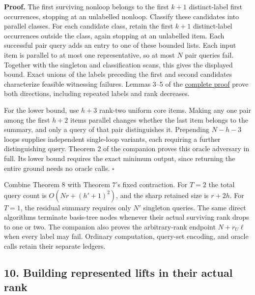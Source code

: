 \textbf{Proof.} The first surviving nonloop belongs to the first \(k+1\) distinct-label first occurrences, stopping at an unlabelled nonloop. Classify these candidates into parallel classes. For each candidate class, retain the first \(k+1\) distinct-label occurrences outside the class, again stopping at an unlabelled item. Each successful pair query adds an entry to one of these bounded lists. Each input item is parallel to at most one representative, so at most \(N\) pair queries fail. Together with the singleton and classification scans, this gives the displayed bound. Exact unions of the labels preceding the first and second candidates characterize feasible witnessing failures. Lemmas 3--5 of the \href{https://github.com/icekylinx/algorithm-frontier/blob/main/problems/matroid-failure-summaries/manuscripts/optimal-rank-two-prefix-oracle-construction.md}{complete proof} prove both directions, including repeated labels and rank decreases.

For the lower bound, use \(h+3\) rank-two uniform core items. Making any one pair among the first \(h+2\) items parallel changes whether the last item belongs to the summary, and only a query of that pair distinguishes it. Prepending \(N-h-3\) loops supplies independent single-loop variants, each requiring a further distinguishing query. Theorem 2 of the companion proves this oracle adversary in full. Its lower bound requires the exact minimum output, since returning the entire ground needs no oracle calls. \hfill\(\square\)

Combine Theorem 8 with Theorem 7's fixed contraction. For \(T=2\) the total query count is \(O(Nr+(h'+1)^2)\), and the sharp retained size is \(r+2h\). For \(T=1\), the residual summary requires only \(N'\) singleton queries. The same direct algorithms terminate basis-tree nodes whenever their actual surviving rank drops to one or two. The companion also proves the arbitrary-rank endpoint \(N+r_U\ell\) when every label may fail. Ordinary computation, query-set encoding, and oracle calls retain their separate ledgers.

\hypertarget{af-240b5086c5-building-represented-lifts-in-their-actual-rank}{%
\subsection{10. Building represented lifts in their actual rank}\label{af-240b5086c5-building-represented-lifts-in-their-actual-rank}}

